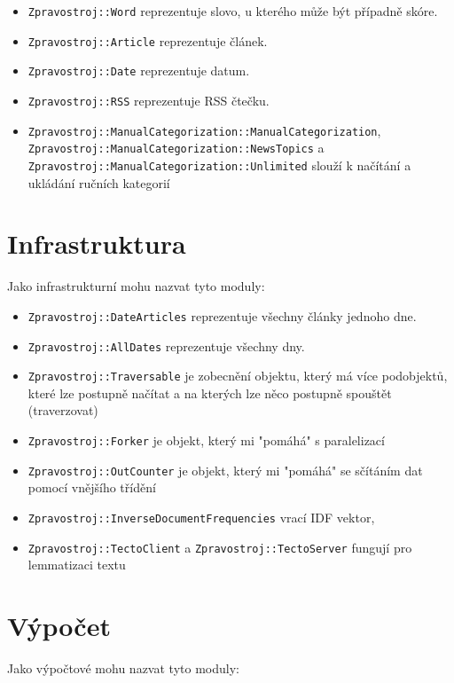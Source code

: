 \documentclass[12pt,a4paper]{report}
\begin{document}
\begin{itemize}
	\item \texttt{Zpravostroj::Word} reprezentuje slovo, u kterého může být případně skóre.

	\item \texttt{Zpravostroj::Article} reprezentuje článek.

	\item \texttt{Zpravostroj::Date} reprezentuje datum.

	\item \texttt{Zpravostroj::RSS} reprezentuje RSS čtečku.
	
	\item \texttt{Zpravostroj::ManualCategorization::ManualCategorization}, \texttt{Zpravostroj::ManualCategorization::NewsTopics} a \texttt{Zpravostroj::ManualCategorization::Unlimited} slouží k načítání a ukládání ručních kategorií
	
\end{itemize}	

\section{Infrastruktura}
Jako infrastrukturní mohu nazvat tyto moduly:

\begin{itemize}
	\item \texttt{Zpravostroj::DateArticles} reprezentuje všechny články jednoho dne.
	\item \texttt{Zpravostroj::AllDates} reprezentuje všechny dny. 
	\item \texttt{Zpravostroj::Traversable} je zobecnění objektu, který má více podobjektů, které lze postupně načítat a na kterých lze něco postupně spouštět (traverzovat)
	\item \texttt{Zpravostroj::Forker} je objekt, který mi "pomáhá" s paralelizací
	\item \texttt{Zpravostroj::OutCounter} je objekt, který mi "pomáhá" se sčítáním dat pomocí vnějšího třídění
	\item \texttt{Zpravostroj::InverseDocumentFrequencies} vrací IDF vektor,
	\item \texttt{Zpravostroj::TectoClient} a \texttt{Zpravostroj::TectoServer} fungují pro lemmatizaci textu
\end{itemize}	
	
\section{Výpočet}
Jako výpočtové mohu nazvat tyto moduly:
\end{document}
